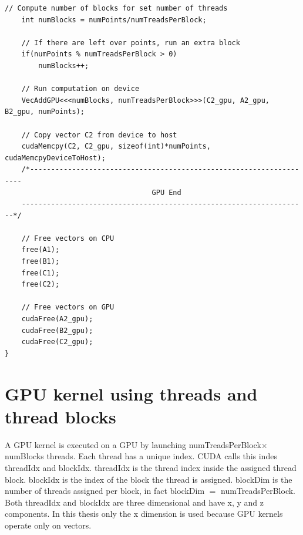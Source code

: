 \begin{lstlisting}[caption={Comparison of CPU verse GPU code.},label={code:GPUvsCPU}]
	// Compute number of blocks for set number of threads
	int numBlocks = numPoints/numTreadsPerBlock;

	// If there are left over points, run an extra block
	if(numPoints % numTreadsPerBlock > 0)
		numBlocks++;

	// Run computation on device
	VecAddGPU<<<numBlocks, numTreadsPerBlock>>>(C2_gpu, A2_gpu, B2_gpu, numPoints);

	// Copy vector C2 from device to host
	cudaMemcpy(C2, C2_gpu, sizeof(int)*numPoints, cudaMemcpyDeviceToHost);
	/*--------------------------------------------------------------------
                               	   GPU End
	--------------------------------------------------------------------*/

	// Free vectors on CPU
	free(A1);
	free(B1);
	free(C1);
	free(C2);

	// Free vectors on GPU
	cudaFree(A2_gpu);
	cudaFree(B2_gpu);
	cudaFree(C2_gpu);
}
\end{lstlisting}
\doublespacing

\section{GPU kernel using threads and thread blocks}
A GPU kernel is executed on a GPU by launching numTreadsPerBlock$\times$numBlocks threads.
Each thread has a unique index.
CUDA calls this indes threadIdx and blockIdx.
threadIdx is the thread index inside the assigned thread block.
blockIdx is the index of the block the thread is assigned.
blockDim is the number of threads assigned per block, in fact blockDim $=$ numTreadsPerBlock.
Both threadIdx and blockIdx are three dimensional and have x, y and z components.
In this thesis only the x dimension is used because GPU kernels operate only on vectors.

